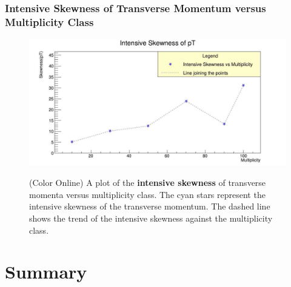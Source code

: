 \documentclass[letterpaper,aps,prc,superscriptaddress,nofootinbib,10pt,showpacs,floatfix]{revtex4-2}
\begin{document}
\subsubsection{Intensive Skewness of Transverse Momentum versus Multiplicity Class}
\label{subsubsec:intskew}
\vspace{-5mm}
\begin{figure}[!htb]
\begin{minipage}{\textwidth}
   \label{Fig:9}
     \centering
     \renewcommand{\thefigure}{9}
     \includegraphics[width=\linewidth]{intskew}
     \begin{minipage}{0.8\textwidth}
     \caption{(Color Online) A plot of the \textbf{intensive skewness} of transverse momenta versus multiplicity class. The cyan stars represent the intensive skewness of the transverse momentum. The dashed line shows the trend of the intensive skewness against the multiplicity class.}
     \end{minipage}
     
\end{minipage}
\end{figure}






\section{Summary}
\end{document}
